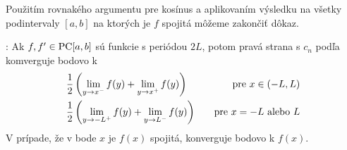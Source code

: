 \begin{dokaz}
    Použitím rovnakého argumentu pre kosínus a aplikovaním výsledku 
    na všetky podintervaly $[a,b]$ na ktorých je $f$ spojitá môžeme
    zakončiť dôkaz.
\end{dokaz}

\begin{veta}
    :
    Ak $f, f' \in \mbox{PC}[a,b]$ sú funkcie s periódou $2L$, potom 
    pravá strana \todo{} s $c_n$ podľa \todo{} komverguje
    bodovo k
    \begin{align}
        &\frac{1}{2}\left( \lim_{y\rightarrow x^-} f(y) +
                \lim_{y\rightarrow x^+} f(y)\right) \quad &\mbox{pre\ }
                x\in(-L,L) \\
        &\frac{1}{2}\left( \lim_{y\rightarrow -L^+} f(y) +
                \lim_{y\rightarrow L^-} f(y)\right) \quad &\mbox{pre\ }
                x=-L \mbox{\ alebo\ } L            
    \end{align}
    V prípade, že v bode $x$ je $f(x)$ spojitá, \todo{} konverguje
    bodovo k $f(x)$.
\end{veta}

